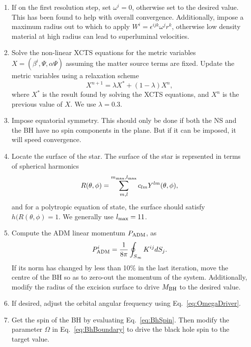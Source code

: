 \begin{enumerate}
\item If on the first resolution step, set $\omega^i=0$, otherwise set
  to the desired value. This has been found to help with overall convergence. Additionally, impose a maximum radius out to which to apply $W^i=\epsilon^{ijk}\omega^jr^k$, otherwise low density material at high radius can lead to superluminal velocities.

\item Solve the non-linear XCTS equations for the metric variables
  $X=\left(\beta^i,\Psi,\alpha\Psi\right)$ assuming the matter source
  terms are fixed. Update the metric variables using a relaxation
  scheme
\begin{equation}
X^{n+1}=\lambda X^{*} + (1-\lambda)X^n,
\end{equation}
where $X^{*}$ is the result found by solving the XCTS equations, and $X^{n}$ is
the previous value of $X$.
We use $\lambda=0.3$.

\item Impose equatorial symmetry. This should only be done if both the
  NS and the BH have no spin components in the plane. But if it can be
  imposed, it will speed convergence.

\item Locate the surface of the star. The surface of the star is
  reprsented in terms of spherical harmonics
\begin{equation}
\label{eq:NSSurf}
R(\theta,\phi)=\sum_{m,l}^{m_{\rm max},l_{\rm max}} c_{lm}Y^{lm}(\theta,\phi)
,
\end{equation}
and for a polytropic equation of state, the surface
should satisfy $h(R(\theta,\phi)=1$. We generally use $l_{\rm max}=11$.

\item Compute the ADM linear momentum $P_{\rm ADM}$, as 
\begin{equation}
P_{\rm ADM}^i = \frac{1}{8\pi}\oint_{S_{\infty}}K^{ij}dS_j.
\end{equation}
If its norm has changed by less than 10\% in the last iteration, move
the centre of the BH so as to zero-out the momentum of the
system. Additionally, modify the radius of the excision surface to
drive $M_{\rm BH}$ to the desired value.

\item If desired, adjust the orbital angular frequency using Eq.~\ref{eq:OmegaDriver}.

\item Get the spin of the BH by evaluating Eq.~\ref{eq:BhSpin}. Then
  modify the parameter $\Omega$ in Eq.~\ref{eq:BhBoundary} to drive
  the black hole spin to the target value.


\end{enumerate}
